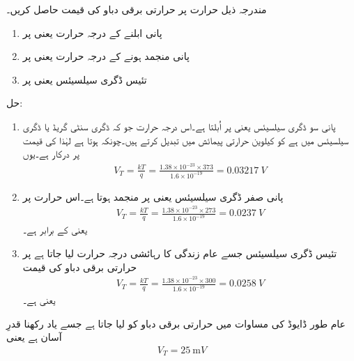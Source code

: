 مندرجہ ذیل حرارت پر حرارتی برقی دباو   کی قیمت حاصل کریں۔
\begin{enumerate}
\item
پانی ابلنے کے درجہ حرارت یعنی   پر 

\item

پانی منجمد ہونے کے درجہ حرارت یعنی  پر
\item

تئیس ڈگری سیلسیئس یعنی   پر
\end{enumerate}




حل:
\begin{enumerate}
\item
پانی سو ڈگری سیلسیئس یعنی  پر اُبلتا ہے۔اس درجہ حرارت جو کہ ڈگری سنٹی گریڈ یا ڈگری سیلسیئس   میں ہے کو کیلوین  حرارتی پیمائش میں تبدیل کرتے ہیں۔چونکہ  ہوتا ہے لہٰذا  کی قیمت  پر درکار ہے۔یوں 
\begin{align*}
V_T =\frac{k T}{q} =\frac{1.38 \times 10^{-23} \times 373}{1.6 \times 10^{-19}}=\SI{0.03217}{V}
\end{align*}

\item
پانی صفر ڈگری سیلسیئس یعنی  پر منجمد ہوتا ہے۔اس حرارت پر
\begin{align*}
V_T=\frac{k T}{q}=\frac{1.38 \times 10^{-23} \times 273}{1.6 \times 10^{-19}}=\SI{0.0237}{V}
\end{align*}
یعنی  کے برابر ہے۔
\item
تئیس ڈگری سیلسیئس جسے عام زندگی کا رہائشی درجہ حرارت لیا جاتا ہے پر حرارتی برقی دباو کی قیمت 
\begin{align*}
V_T=\frac{k T}{q}=\frac{1.38 \times 10^{-23} \times 300}{1.6 \times 10^{-19}}=\SI{0.0258}{V}
\end{align*}
یعنی   ہے۔
\end{enumerate}
عام طور ڈایوڈ کی مساوات میں حرارتی برقی دباو کو  لیا جاتا ہے جسے یاد رکھنا قدرِ آسان ہے یعنی
\begin{align}
V_T=\SI{25}{\milli V}
\end{align}


